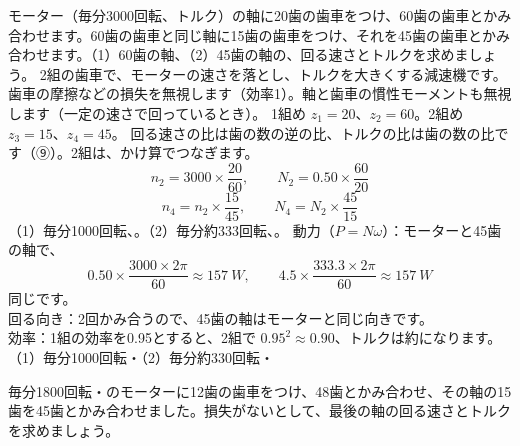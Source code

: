 \begin{phreidai}[歯車列の速さとトルク]\label{ph:力-7:ex11}
モーター（毎分3000回転、トルク）の軸に20歯の歯車をつけ、60歯の歯車とかみ合わせます。60歯の歯車と同じ軸に15歯の歯車をつけ、それを45歯の歯車とかみ合わせます。（1）60歯の軸、（2）45歯の軸の、回る速さとトルクを求めましょう。
\phbamen
2組の歯車で、モーターの速さを落とし、トルクを大きくする減速機です。
\phmushi
歯車の摩擦などの損失を無視します（効率1）。軸と歯車の慣性モーメントも無視します（一定の速さで回っているとき）。
\phzu
1組め $z_1=20$、$z_2=60$。2組め $z_3=15$、$z_4=45$。
\phriyu
回る速さの比は歯の数の逆の比、トルクの比は歯の数の比です（⑨）。2組は、かけ算でつなぎます。
\phtateru
\[n_2=3000\times\frac{20}{60},\qquad N_2=0.50\times\frac{60}{20}\]
\[n_4=n_2\times\frac{15}{45},\qquad N_4=N_2\times\frac{45}{15}\]
\phtoku
（1）毎分1000回転、。（2）毎分約333回転、。
\phtashikame
動力（$P=N\omega$）：モーターと45歯の軸で、
\[0.50\times\frac{3000\times2\pi}{60}\approx\qty{157}{W},\qquad 4.5\times\frac{333.3\times2\pi}{60}\approx\qty{157}{W}\]
同じです。\\
回る向き：2回かみ合うので、45歯の軸はモーターと同じ向きです。\\
効率：1組の効率を0.95とすると、2組で $0.95^2\approx0.90$、トルクは約になります。
\kotae （1）毎分1000回転・\quad（2）毎分約330回転・
\end{phreidai}
\begin{jibun}
毎分1800回転・のモーターに12歯の歯車をつけ、48歯とかみ合わせ、その軸の15歯を45歯とかみ合わせました。損失がないとして、最後の軸の回る速さとトルクを求めましょう。
\end{jibun}

